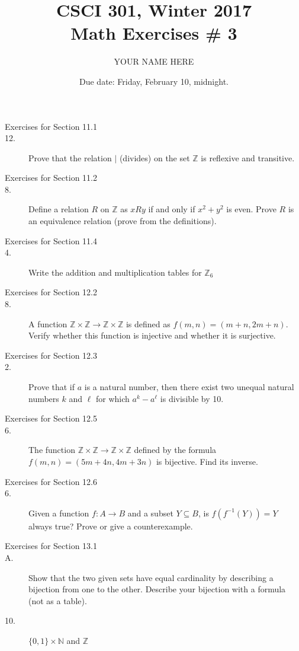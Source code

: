 \documentclass{article}
\title{CSCI 301, Winter 2017\\Math Exercises \# 3}
\author{YOUR NAME HERE}
\date{Due date:  Friday, February 10, midnight.}
\begin{document}
\maketitle

\begin{description}
\item[Exercises for Section 11.1]

\item[12.] Prove that the relation $\mid$ (divides) on the set
  $\mathbb{Z}$ is reflexive and transitive.
  

\item[Exercises for Section 11.2]
\item[8.] Define a relation $R$ on $\mathbb{Z}$ as $xRy$ if and only if
  $x^2 + y^2$ is even.  Prove $R$ is an equivalence relation (prove
  from the definitions).  
  
\item[Exercises for Section 11.4]
\item[4.] Write the addition and multiplication tables for $\mathbb{Z}_6$

\item[Exercises for Section 12.2]
\item[8.]  A function $\mathbb{Z}\times\mathbb{Z} \rightarrow
  \mathbb{Z}\times\mathbb{Z}$ is defined as $f(m,n) = (m+n, 2m+n)$.
  Verify whether this function is injective and whether it is
  surjective.

  
\item[Exercises for Section 12.3]
\item[2.]  Prove that if  $a$ is a natural number,
  then there exist two unequal natural numbers $k$ and $\ell$
  for which $a^k - a^\ell$ is divisible by 10.


\item[Exercises for Section 12.5]
\item[6.]   The function
  $\mathbb{Z}\times\mathbb{Z} \rightarrow \mathbb{Z}\times\mathbb{Z}$
  defined by the formula
  $f(m,n) = (5m+4n,4m+3n)$
  is bijective.  Find its inverse.
  

\item[Exercises for Section 12.6]
\item[6.]  Given a function $f:A\rightarrow B$ and a subset
  $Y\subseteq B$, is $f(f^{-1}(Y)) = Y$ always true?  Prove or
  give a counterexample.

\item[Exercises for Section 13.1]
\item[A.] Show that the two given sets have equal cardinality
  by describing a bijection from one to the other.  Describe
  your bijection with a formula (not as a table).
\item[10.] $\{0,1\}\times\mathbb{N}$ and $\mathbb{Z}$



\end{description}
\end{document}
